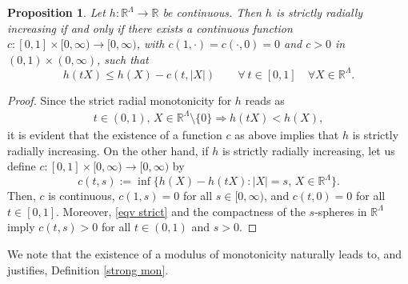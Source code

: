 \documentclass[a4paper,11pt]{article}
\numberwithin{equation}{section}
\newtheorem{Proposition}[Theorem]{Proposition}
\newcommand{\numberset}{\mathbb}
\newcommand{\R}{\numberset{R}}
\theoremstyle{definition}
\begin{document}
\begin{Proposition}\label{ex c}
Let $h:\R^\Lambda\longrightarrow\R$ be continuous. Then $h$ is strictly radially increasing if and only if there exists a continuous function $c:[0,1]\times[0,\infty)\longrightarrow [0,\infty)$, with $c(1,\cdot)=c(\cdot,0)=0$ and $c>0$ in $(0,1)\times(0,\infty)$, such that
$$
h(tX)\leq h(X)-c(t,|X|)\qquad\forall\  t\in[0,1]\quad\forall X\in\R^\Lambda.
$$ 
\end{Proposition}
\begin{proof}
Since the strict radial monotonicity for $h$ reads as
\begin{align}\label{eqv strict}
t\in(0,1),\, X\in\R^\Lambda\setminus\{0\}\Longrightarrow h(tX)<h(X),
\end{align}
it is evident that the existence of a function $c$ as above implies that $h$ is strictly radially increasing. On the other hand, if $h$ is strictly radially increasing, let us define $c:[0,1]\times[0,\infty)\longrightarrow [0,\infty)$ by
$$
c(t,s):=\inf\{h(X)-h(tX): |X|=s,\, X\in\R^\Lambda\}.
$$
Then, $c$ is continuous, $c(1,s)=0$ for all $s\in[0,\infty)$, and $c(t,0)=0$ for all $t\in[0,1]$. Moreover,   \eqref{eqv strict} and
the compactness of the $s$-spheres in $\R^\Lambda$ imply $c(t,s)>0$ for all $t\in (0,1)$ and $s>0$.
\end{proof}
We note that the existence of a modulus of monotonicity naturally leads to, and justifies, Definition \ref{strong mon}.
\end{document}
